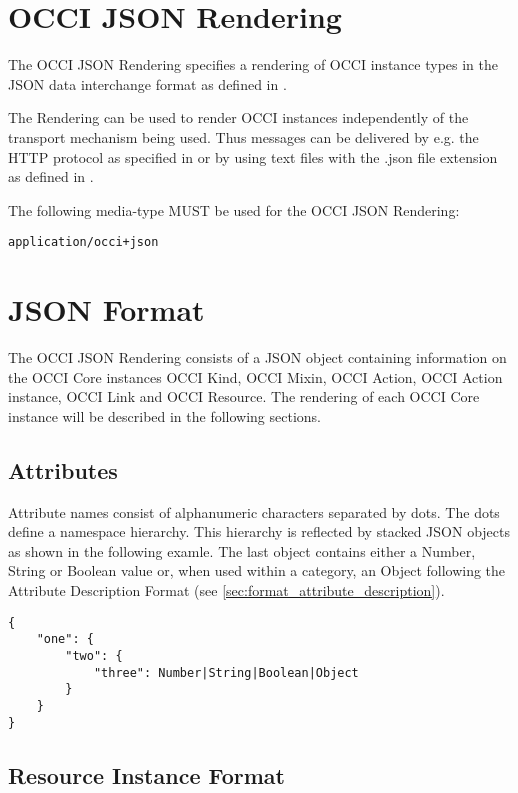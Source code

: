 \documentclass[10pt,a4paper]{article}
\begin{document}
\section{OCCI JSON Rendering}

The OCCI JSON Rendering specifies a rendering of OCCI instance types in the JSON
data interchange format as defined in \cite{rfc4627}.

The Rendering can be used to render OCCI instances independently of the
transport mechanism being used. Thus messages can be delivered by e.g. the HTTP
protocol as specified in \cite{occi:http_rendering} or by using text files with
the .json file extension as defined in \cite{rfc4627}.

The following media-type MUST be used for the OCCI JSON Rendering:

{\tt application/occi+json}

\section{JSON Format}
\label{sec:json_format}
The OCCI JSON Rendering consists of a JSON object containing information on the 
OCCI Core instances OCCI Kind, OCCI Mixin, OCCI Action, OCCI Action instance,
OCCI Link and OCCI Resource. The rendering of each OCCI Core instance will be
described in the following sections. 

\subsection{Attributes}

Attribute names consist of alphanumeric characters separated by dots. The dots
define a namespace hierarchy. This hierarchy is reflected by stacked JSON
objects as shown in the following examle. The last object contains either a
Number, String or Boolean value or, when used within a category, an Object
following the Attribute Description Format (see
\ref{sec:format_attribute_description}).
\begin{lstlisting}
{
    "one": {
        "two": {
            "three": Number|String|Boolean|Object
        }
    }
}
\end{lstlisting}

\subsection{Resource Instance Format}
\label{sec:format_resource}
\end{document}
